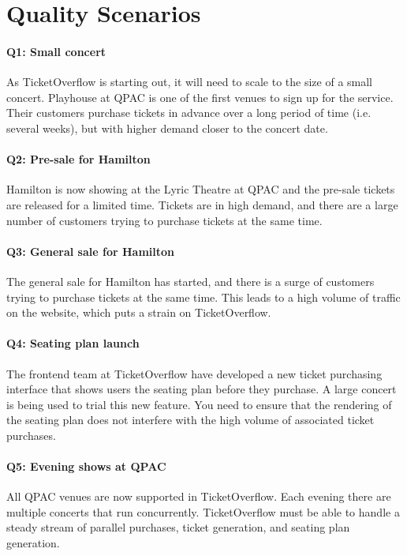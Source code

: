 \documentclass{csse4400}
\begin{document}
\section{Quality Scenarios}\label{sec:scenarios}

\paragraph{Q1: Small concert}
As TicketOverflow is starting out,
it will need to scale to the size of a small concert.
Playhouse at QPAC is one of the first venues to sign up for the service.
Their customers purchase tickets in advance over a long period of time (i.e. several weeks),
but with higher demand closer to the concert date.

\paragraph{Q2: Pre-sale for Hamilton}
Hamilton is now showing at the Lyric Theatre at QPAC and the pre-sale tickets are released for a limited time.
Tickets are in high demand, and there are a large number of customers trying to purchase tickets at the same time.

\paragraph{Q3: General sale for Hamilton}
The general sale for Hamilton has started,
and there is a surge of customers trying to purchase tickets at the same time.
This leads to a high volume of traffic on the website, which puts a strain on TicketOverflow.

\paragraph{Q4: Seating plan launch}
The frontend team at TicketOverflow have developed a new ticket purchasing interface that shows users the seating plan before they purchase.
A large concert is being used to trial this new feature.
You need to ensure that the rendering of the seating plan does not interfere with the high volume of associated ticket purchases.

\paragraph{Q5: Evening shows at QPAC}
All QPAC venues are now supported in TicketOverflow.
Each evening there are multiple concerts that run concurrently.
TicketOverflow must be able to handle a steady stream of parallel purchases, ticket generation, and seating plan generation.
\end{document}
